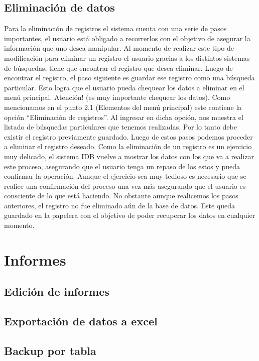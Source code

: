 \documentclass[a4paper,10pt]{article}
\begin{document}
\subsection{Eliminación de datos}
Para la eliminación de registros el sistema cuenta con una serie de pasos importantes, el usuario está obligado a recorrerlos con el objetivo de asegurar la información que uno desea manipular. Al momento de realizar este tipo de modificación para eliminar un registro el usuario gracias a los distintos sistemas de búsquedas, tiene que encontrar el registro que desea eliminar. Luego de encontrar el registro, el paso siguiente es guardar ese registro como una búsqueda particular. Esto logra que el usuario pueda chequear los datos a eliminar en el menú principal. Atención! (es muy importante chequear los datos). Como mencionamos en el punto 2.1 (Elementos del menú principal) este contiene la opción “Eliminación de registros”. Al ingresar en dicha opción, nos muestra el listado de búsquedas particulares que tenemos realizadas. Por lo tanto debe existir el registro previamente guardado. Luego de estos pasos podemos proceder a eliminar el registro deseado.
Como la eliminación de un registro es un ejercicio muy delicado, el sistema IDB vuelve a mostrar los datos con los que va a realizar este proceso, asegurando que el usuario tenga un repaso de los estos y pueda confirmar la operación. Aunque el ejercicio sea muy tedioso es necesario que se realice una confirmación del proceso una vez más asegurando que el usuario es consciente de lo que está haciendo. No obstante aunque realicemos los pasos anteriores, el registro no fue eliminado aún de la base de datos. Este queda guardado en la papelera con el objetivo de poder recuperar los datos en cualquier momento.

\section{Informes}
\subsection{Edición de informes}
\subsection{Exportación de datos a excel}
\subsection{Backup por tabla}
\end{document}

